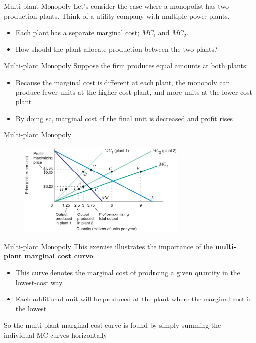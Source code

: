 \documentclass[11pt,t]{beamer}
\begin{document}
\begin{frame}{Multi-plant Monopoly}
  Let's consider the case where a monopolist has two production plants. Think of a utility company with multiple power plants.

  \begin{itemize}
    \item Each plant has a separate marginal cost; $MC_1$ and $MC_2$.
    
    \item How should the plant allocate production between the two plants?
  \end{itemize}

\end{frame}

\begin{frame}{Multi-plant Monopoly}
  Suppose the firm produces equal amounts at both plants:

  \begin{itemize}
    \item Because the marginal cost is different at each plant, the monopoly can produce fewer units at the higher-cost plant, and more units at the lower cost plant
    
    \item By doing so, marginal cost of the final unit is decreased and profit rises
  \end{itemize}
\end{frame}

\begin{frame}{Multi-plant Monopoly}
  \begin{figure}
    \includegraphics[width=310px]{figures/fig11_14.jpg}
  \end{figure}
\end{frame}

\begin{frame}{Multi-plant Monopoly}
  This exercise illustrates the importance of the \textbf{multi-plant marginal cost curve}
  \begin{itemize}
    \item This curve denotes the marginal cost of producing a given quantity in the lowest-cost way
    
    \item Each additional unit will be produced at the plant where the marginal cost is the lowest
  \end{itemize}

  \bigskip
  So the multi-plant marginal cost curve is found by simply summing the individual MC curves horizontally
\end{frame}
\end{document}
